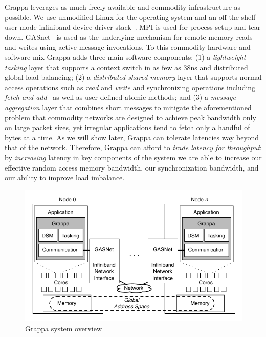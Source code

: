 Grappa leverages as much freely available and commodity infrastructure as possible. We use unmodified Linux for the operating system and an off-the-shelf user-mode infiniband device driver stack~\cite{OFED}. MPI is used for process setup and tear down. GASnet~\cite{gasnet} is used as the underlying mechanism for remote memory reads and writes using active message invocations. To this commodity hardware and software mix Grappa adds three main software components: (1) a \emph{lightweight tasking\/} layer that supports a context switch in as few as 38ns and distributed global load balancing; (2) a \emph{distributed shared memory\/} layer that supports normal access operations such as \emph{read\/} and \emph{write\/} and synchronizing operations including \emph{fetch-and-add\/}~\cite{fetchandadd} as well as user-defined atomic methods; and (3) a \emph{message aggregation\/} layer that combines short messages to mitigate the aforementioned problem that commodity networks are designed to achieve peak bandwidth only on large packet sizes, yet irregular applications tend to fetch only a handful of bytes at a time. As we will show later, Grappa can tolerate latencies way beyond that of the network. Therefore, Grappa can afford to \emph{trade latency for throughput\/}: by {\em increasing\/} latency in key components of the system we are able to increase our effective random access memory bandwidth, our synchronization bandwidth, and our ability to improve load imbalance.

\begin{figure}[t]
\begin{center}     
  \includegraphics[width=0.95\columnwidth]{figs/system-overview}
\begin{minipage}{0.95\columnwidth} 
  \caption{\label{fig:grappa} Grappa system overview}
\end{minipage}
\vspace{-3ex}
\end{center}
\end{figure}

